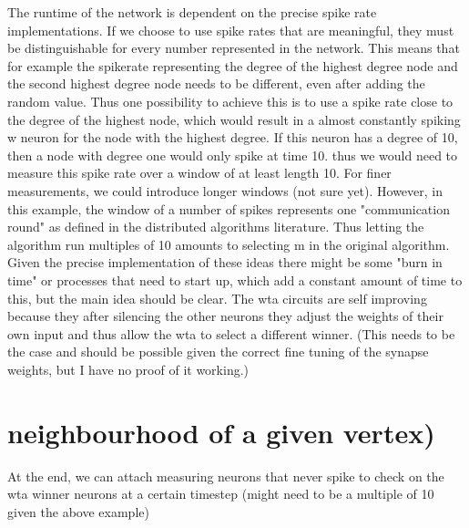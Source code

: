 The runtime of the network is dependent on the precise spike rate
implementations. If we choose to use spike rates that are meaningful, they
must be distinguishable for every number represented in the network. This
means that for example the spikerate representing the degree of the highest
degree node and the second highest degree node needs to be different, even
after adding the random value. Thus one possibility to achieve this is to use a
spike rate close to the degree of the highest node, which would result in a
almost constantly spiking w neuron for the node with the highest degree. If this
neuron has a degree of 10, then a node with degree one would only spike at
time 10. thus we would need to measure this spike rate over a window of at
least length 10. For finer measurements, we could introduce longer windows
(not sure yet). However, in this example, the window of a number of spikes
represents one "communication round" as defined in the distributed algorithms
literature. Thus letting the algorithm run multiples of 10 amounts to selecting m
in the original algorithm. Given the precise implementation of these ideas there
might be some "burn in time" or processes that need to start up, which add a
constant amount of time to this, but the main idea should be clear. The wta
circuits are self improving because they after silencing the other neurons they
adjust the weights of their own input and thus allow the wta to select a different
winner. (This needs to be the case and should be possible given the correct
fine tuning of the synapse weights, but I have no proof of it working.)


\section{neighbourhood of a given vertex)}\label{sec:neighbourhood}
At the end, we can attach measuring neurons that never spike to check on the
wta winner neurons at a certain timestep (might need to be a multiple of 10
given the above example)